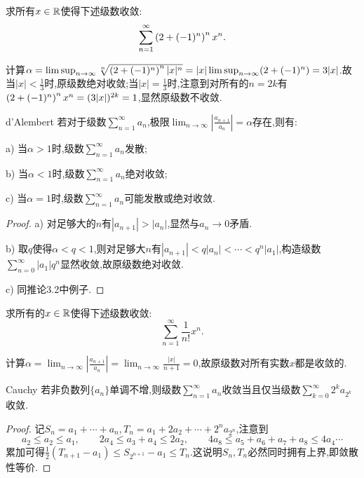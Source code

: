 \begin{example}
	求所有$x \in \mathbb{R}$使得下述级数收敛:$$\sum_{n=1}^{\infty} \left( 2+(-1)^n \right)^n x^n.$$
\end{example}
\begin{solution}
	计算$\alpha = \limsup_{n\to \infty} \sqrt[n]{\left( 2+(-1)^n \right)^n |x|^n}= |x|\limsup_{n\to \infty} (2+(-1)^n)=3|x|$.故当$|x|<\frac{1}{3}$时,原级数绝对收敛;当$|x|=\frac{1}{3}$时,注意到对所有的$n=2k$有$\left( 2+(-1)^n \right)^n x^n = (3|x|)^{2k}=1$,显然原级数不收敛.
\end{solution}

\begin{corollary}{d’Alembert}
	若对于级数$\sum_{n=1}^{\infty} a_n$,极限$\lim_{n\to \infty}|\frac{a_{n+1}}{a_n} |=\alpha$存在,则有:
	
	a) 当$\alpha >1$时,级数$\sum_{n=1}^{\infty} a_n$发散;
	
	b) 当$\alpha <1$时,级数$\sum_{n=1}^{\infty} a_n$绝对收敛;
	
	c) 当$\alpha =1$时,级数$\sum_{n=1}^{\infty} a_n$可能发散或绝对收敛.
\end{corollary}
\begin{proof}
	a) 对足够大的$n$有$|a_{n+1}|>|a_n|$,显然与$a_n\to 0$矛盾.
	
	b) 取$q$使得$\alpha < q <1$,则对足够大$n$有$|a_{n+1}|<q|a_n|<\cdots < q^n|a_1|$,构造级数$\sum_{n=0}^{\infty} |a_1|q^n$显然收敛,故原级数绝对收敛.
	
	c) 同推论3.2中例子.
\end{proof}

\begin{example}
	求所有的$x \in \mathbb{R}$使得下述级数收敛:$$\sum_{n=1}^{\infty} \frac{1}{n!}x^n.$$
\end{example}
\begin{solution}
	计算$\alpha = \lim_{n\to \infty}|\frac{a_{n+1}}{a_n} | = \lim_{n\to \infty} \frac{|x|}{n+1} = 0$,故原级数对所有实数$x$都是收敛的.
\end{solution}

\begin{proposition}{Cauchy}
	若非负数列$\{ a_n \}$单调不增,则级数$\sum_{n=1}^{\infty} a_n$收敛当且仅当级数$\sum_{k=0}^{\infty} 2^ka_{2^k}$收敛.
\end{proposition}
\begin{proof}
	记$S_n=a_1+\cdots +a_n,T_n=a_1+2a_2+\cdots +2^na_{2^n}$,注意到$$a_2 \leq a_2 \leq a_1,\qquad 2a_4\leq a_3+a_4 \leq 2a_2,\qquad 4a_8 \leq a_5+a_6+a_7+a_8 \leq 4a_4 \cdots$$
	累加可得$\frac{1}{2}(T_{n+1}-a_1) \leq S_{2^{n+1}}-a_1 \leq T_n$.这说明$S_n,T_n$必然同时拥有上界,即敛散性等价.
\end{proof}

